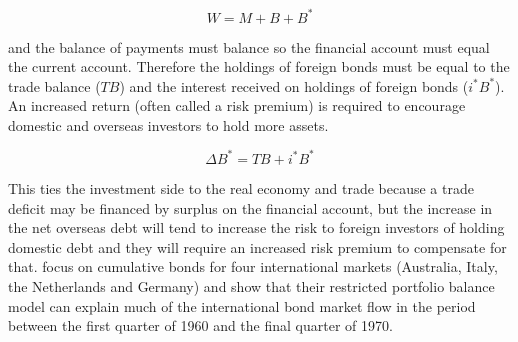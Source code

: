 \documentclass[12pt, a4paper, oneside]{article}\usepackage[]{graphicx}\usepackage[]{color}
\begin{document}
\begin{equation}
W=M+B+B^*
\end{equation}

and the balance of payments must balance so the financial account must equal the current account.  Therefore the holdings of foreign bonds must be equal to the trade balance ($TB$) and the interest received on holdings of foreign bonds ($i^*B^*$).  An increased return (often called a risk premium) is required to encourage domestic and overseas investors to hold more assets.  

\begin{equation}
\Delta B^*= TB + i^* B^*
\end{equation} 

This ties the investment side to the real economy and trade because a trade deficit may be financed by surplus on the financial account, but the increase in the net overseas debt will tend to increase the risk to foreign investors of holding domestic debt and they will require an increased risk premium to compensate for that.  \citep{Kouri1974International} focus on cumulative bonds for four international markets (Australia, Italy, the Netherlands and Germany) and show that their restricted portfolio balance model can explain much of the international bond market flow in the period between the first quarter of 1960 and the final quarter of 1970.  %

\end{document}
